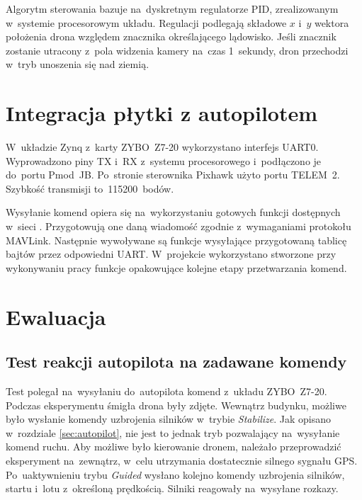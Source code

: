 Algorytm sterowania bazuje na~dyskretnym regulatorze PID, zrealizowanym w~systemie procesorowym układu.
Regulacji podlegają składowe $x$ i~$y$ wektora położenia drona względem znacznika określającego lądowisko. 
Jeśli znacznik zostanie utracony z~pola widzenia kamery na~czas 1~sekundy, dron przechodzi w~tryb unoszenia się nad ziemią.

\section{Integracja płytki z autopilotem}
\label{sec:integracja_plytka_autopilot}

W~układzie Zynq z~karty ZYBO~Z7-20 wykorzystano interfejs UART0. 
Wyprowadzono piny TX i~RX z~systemu procesorowego i~podłączono je do~portu Pmod~JB. 
Po~stronie sterownika Pixhawk użyto portu TELEM~2. 
Szybkość transmisji to~115200~bodów.

Wysyłanie komend opiera się na~wykorzystaniu gotowych funkcji dostępnych w~sieci \cite{github_mavlink}.
Przygotowują one daną wiadomość zgodnie z~wymaganiami protokołu MAVLink. 
Następnie wywoływane są funkcje wysyłające przygotowaną tablicę bajtów przez odpowiedni UART. 
W~projekcie wykorzystano stworzone przy wykonywaniu pracy \cite{mgr} funkcje opakowujące kolejne etapy przetwarzania komend.

\section{Ewaluacja}


\subsection{Test reakcji autopilota na zadawane komendy}
\label{sec:test_autopilota}
Test polegał na~wysyłaniu do~autopilota komend z~układu ZYBO~Z7-20. %
Podczas eksperymentu śmigła drona były zdjęte. 
Wewnątrz budynku, możliwe było wysłanie komendy uzbrojenia silników w~trybie \textit{Stabilize}. 
Jak opisano w~rozdziale \ref{sec:autopilot}, nie jest to jednak tryb pozwalający na~wysyłanie komend ruchu.
Aby możliwe było kierowanie dronem, należało przeprowadzić eksperyment na~zewnątrz, w~celu utrzymania dostatecznie silnego sygnału GPS. 
Po~uaktywnieniu trybu \textit{Guided} wysłano kolejno komendy uzbrojenia silników, startu i~lotu z~określoną prędkością. 
Silniki reagowały na~wysyłane rozkazy.


